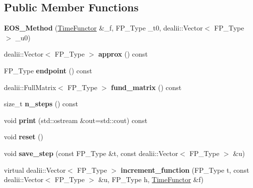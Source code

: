 \subsection*{Public Member Functions}
\begin{DoxyCompactItemize}
\item 
\mbox{\label{classEOS__Method_a531d5ee86fcad27fa2299e320417ed26}} 
{\bfseries E\+O\+S\+\_\+\+Method} (\hyperlink{classTimeFunctor}{Time\+Functor} \&\+\_\+f, F\+P\+\_\+\+Type \+\_\+t0, dealii\+::\+Vector$<$ F\+P\+\_\+\+Type $>$ \+\_\+u0)
\item 
\mbox{\label{classEOS__Method_a51157a38f285e475337c4e67d1ccd279}} 
dealii\+::\+Vector$<$ F\+P\+\_\+\+Type $>$ {\bfseries approx} () const
\item 
\mbox{\label{classEOS__Method_a3f7157f6b6518ea3395f90b3c5a795b8}} 
F\+P\+\_\+\+Type {\bfseries endpoint} () const
\item 
\mbox{\label{classEOS__Method_aa733b1416d87f4382d4b6abd24c59013}} 
dealii\+::\+Full\+Matrix$<$ F\+P\+\_\+\+Type $>$ {\bfseries fund\+\_\+matrix} () const
\item 
\mbox{\label{classEOS__Method_aa323926fa9f41a8a011c1a370c2bed7d}} 
size\+\_\+t {\bfseries n\+\_\+steps} () const
\item 
\mbox{\label{classEOS__Method_ae7f7cd39eddbc7dde0c004773c00ad6e}} 
void {\bfseries print} (std\+::ostream \&out=std\+::cout) const
\item 
\mbox{\label{classEOS__Method_a2abc87316deb095a84ed74e1ddfd56ec}} 
void {\bfseries reset} ()
\item 
\mbox{\label{classEOS__Method_a8f1d297e535ca2ca7441bafcea43742c}} 
void {\bfseries save\+\_\+step} (const F\+P\+\_\+\+Type \&t, const dealii\+::\+Vector$<$ F\+P\+\_\+\+Type $>$ \&u)
\item 
\mbox{\label{classEOS__Method_a0f185a8f9e48c3db101b1f3e6b588173}} 
virtual dealii\+::\+Vector$<$ F\+P\+\_\+\+Type $>$ {\bfseries increment\+\_\+function} (F\+P\+\_\+\+Type t, const dealii\+::\+Vector$<$ F\+P\+\_\+\+Type $>$ \&u, F\+P\+\_\+\+Type h, \hyperlink{classTimeFunctor}{Time\+Functor} \&f)

\end{DoxyCompactItemize}
